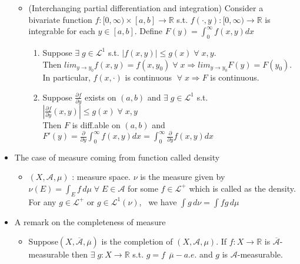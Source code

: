 \documentclass[12pt]{article}
\newcommand{\R}{\mathbb{R}}
\newcommand{\A}{\mathcal{A}}
\newcommand{\LL}{\mathcal{L}}
\newcommand{\exist}{\exists \;}
\newcommand{\forany}{\; \forall \;}
\begin{document}
\begin{itemize}
\begin{itemize}
        \item (Interchanging partial differentiation and integration) Consider a bivariate function $f:[0,\infty)\times [a,b]\rightarrow \R$ s.t. $f(\cdot, y):[0,\infty)\rightarrow \R$ is integrable for each $y\in [a,b]$. Define $F(y)=\int_0^\infty f(x,y)dx$
        \begin{enumerate}
            \item Suppose $\exist g\in \LL^1$ s.t. $|f(x,y)|\leq g(x)\forany x,y$. \\Then $lim_{y\to y_0}f(x,y)=f(x,y_0) \forany x\Rightarrow lim_{y\to y_0}F(y)=F(y_0)$. \\ In particular, $f(x,\cdot)$ is continuous $\forany x \Rightarrow F$ is continuous.
            \item Suppose $\frac{\partial f}{\partial y}$ exists on $(a,b)$ and $\exist g\in \LL^1$ s.t. $|\frac{\partial f}{\partial y}(x,y)|\leq g(x)\forany x,y$ \\ Then $F$ is diff.able on $(a,b)$ and $F'(y)=\frac{\partial}{\partial y} \int_0^\infty f(x,y) dx= \int_0^\infty \frac{\partial}{\partial y}f(x,y) dx$  
        \end{enumerate}
  
    \end{itemize}
    \item The case of measure coming from function called density
    \begin{itemize}
        \item $(X, \A, \mu)$ : measure space. $\nu$ is the measure given by $\nu(E)=\int_E f\, d\mu\forany E\in \A$ for some $f\in \LL^+$ which is called as the density. \\ For any $g\in \LL^+$ or $g\in \LL^1(\nu)$, \, we have $\int g \, d\nu=\int fg \, d\mu$
    \end{itemize} 
    \item A remark on the completeness of measure
    \begin{itemize}
        \item Suppose$(X, \overline{\A}, \overline{\mu})$ is the completion of $(X,\A, \mu)$. If $f:X\rightarrow \R$ is $\overline{\A}$-measurable then $\exist g:X\rightarrow \R$ s.t. $g=f \;\, \overline{\mu}-a.e.$ and $g$ is $\A$-measurable.
    \end{itemize}
\end{itemize}
\clearpage
\end{document}
